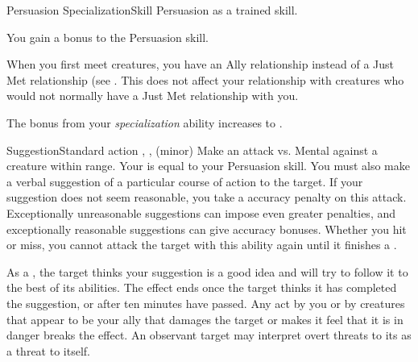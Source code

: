   \begin{feat}{Persuasion Specialization}{Skill}
    \featpre Persuasion as a trained skill.

     You gain a  bonus to the Persuasion skill.

     When you first meet creatures, you have an Ally relationship instead of a Just Met relationship (see .
    This does not affect your relationship with creatures who would not normally have a Just Met relationship with you.

     The bonus from your \textit{specialization} ability increases to .

    \begin{sustainability}{Suggestion}{Standard action}
      \abilitytags {}, ,  (minor)
      \rankline
      Make an attack vs. Mental against a creature within \rngmed range.
      Your  is equal to your Persuasion skill.
      You must also make a verbal suggestion of a particular course of action to the target.
      If your suggestion does not seem reasonable, you take a  accuracy penalty on this attack.
      Exceptionally unreasonable suggestions can impose even greater penalties, and exceptionally reasonable suggestions can give accuracy bonuses.
      Whether you hit or miss, you cannot attack the target with this ability again until it finishes a .

      \hit As a , the target thinks your suggestion is a good idea and will try to follow it to the best of its abilities.
      The effect ends once the target thinks it has completed the suggestion, or after ten minutes have passed.
      Any act by you or by creatures that appear to be your ally that damages the target or makes it feel that it is in danger breaks the effect.
      An observant target may interpret overt threats to its  as a threat to itself.
    \end{sustainability}
  \end{feat}

